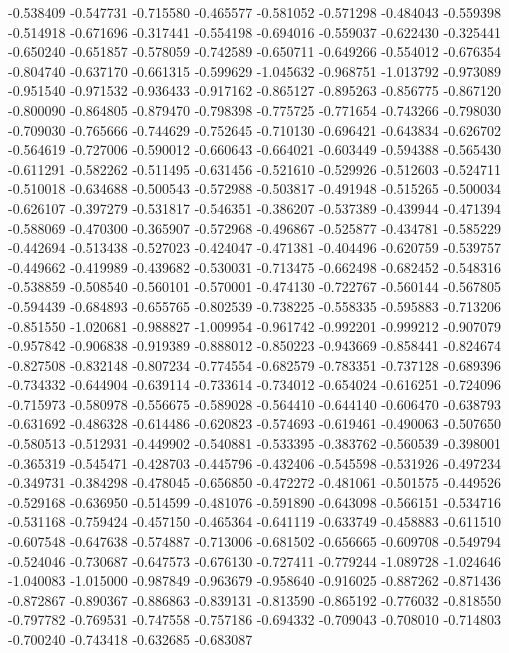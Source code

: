 -0.538409
-0.547731
-0.715580
-0.465577
-0.581052
-0.571298
-0.484043
-0.559398
-0.514918
-0.671696
-0.317441
-0.554198
-0.694016
-0.559037
-0.622430
-0.325441
-0.650240
-0.651857
-0.578059
-0.742589
-0.650711
-0.649266
-0.554012
-0.676354
-0.804740
-0.637170
-0.661315
-0.599629
-1.045632
-0.968751
-1.013792
-0.973089
-0.951540
-0.971532
-0.936433
-0.917162
-0.865127
-0.895263
-0.856775
-0.867120
-0.800090
-0.864805
-0.879470
-0.798398
-0.775725
-0.771654
-0.743266
-0.798030
-0.709030
-0.765666
-0.744629
-0.752645
-0.710130
-0.696421
-0.643834
-0.626702
-0.564619
-0.727006
-0.590012
-0.660643
-0.664021
-0.603449
-0.594388
-0.565430
-0.611291
-0.582262
-0.511495
-0.631456
-0.521610
-0.529926
-0.512603
-0.524711
-0.510018
-0.634688
-0.500543
-0.572988
-0.503817
-0.491948
-0.515265
-0.500034
-0.626107
-0.397279
-0.531817
-0.546351
-0.386207
-0.537389
-0.439944
-0.471394
-0.588069
-0.470300
-0.365907
-0.572968
-0.496867
-0.525877
-0.434781
-0.585229
-0.442694
-0.513438
-0.527023
-0.424047
-0.471381
-0.404496
-0.620759
-0.539757
-0.449662
-0.419989
-0.439682
-0.530031
-0.713475
-0.662498
-0.682452
-0.548316
-0.538859
-0.508540
-0.560101
-0.570001
-0.474130
-0.722767
-0.560144
-0.567805
-0.594439
-0.684893
-0.655765
-0.802539
-0.738225
-0.558335
-0.595883
-0.713206
-0.851550
-1.020681
-0.988827
-1.009954
-0.961742
-0.992201
-0.999212
-0.907079
-0.957842
-0.906838
-0.919389
-0.888012
-0.850223
-0.943669
-0.858441
-0.824674
-0.827508
-0.832148
-0.807234
-0.774554
-0.682579
-0.783351
-0.737128
-0.689396
-0.734332
-0.644904
-0.639114
-0.733614
-0.734012
-0.654024
-0.616251
-0.724096
-0.715973
-0.580978
-0.556675
-0.589028
-0.564410
-0.644140
-0.606470
-0.638793
-0.631692
-0.486328
-0.614486
-0.620823
-0.574693
-0.619461
-0.490063
-0.507650
-0.580513
-0.512931
-0.449902
-0.540881
-0.533395
-0.383762
-0.560539
-0.398001
-0.365319
-0.545471
-0.428703
-0.445796
-0.432406
-0.545598
-0.531926
-0.497234
-0.349731
-0.384298
-0.478045
-0.656850
-0.472272
-0.481061
-0.501575
-0.449526
-0.529168
-0.636950
-0.514599
-0.481076
-0.591890
-0.643098
-0.566151
-0.534716
-0.531168
-0.759424
-0.457150
-0.465364
-0.641119
-0.633749
-0.458883
-0.611510
-0.607548
-0.647638
-0.574887
-0.713006
-0.681502
-0.656665
-0.609708
-0.549794
-0.524046
-0.730687
-0.647573
-0.676130
-0.727411
-0.779244
-1.089728
-1.024646
-1.040083
-1.015000
-0.987849
-0.963679
-0.958640
-0.916025
-0.887262
-0.871436
-0.872867
-0.890367
-0.886863
-0.839131
-0.813590
-0.865192
-0.776032
-0.818550
-0.797782
-0.769531
-0.747558
-0.757186
-0.694332
-0.709043
-0.708010
-0.714803
-0.700240
-0.743418
-0.632685
-0.683087
